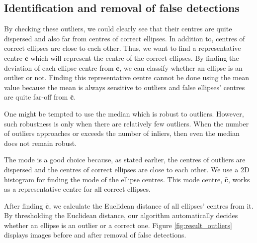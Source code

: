 \documentclass[preprint]{iucr}              %
\begin{document}
\subsection{Identification and removal of false detections}
By checking these outliers, we could clearly see that their centres are quite dispersed and also far from centres of correct ellipses. In addition to, centres of correct ellipses are close to each other. Thus, we want to find a representative centre $\mathbf{\bar{c}}$ which will represent the centre of the correct ellipses. By finding the deviation of each ellipse centre from $\mathbf{\bar{c}}$, we can classify whether an ellipse is an outlier or not. Finding this representative centre cannot be done using the mean value because the mean is always sensitive to outliers and false ellipses' centres are quite far-off from $\mathbf{\bar{c}}$. 

One might be tempted to use the median which is robust to outliers. However, such robustness is only when there are relatively few outliers. When the number of outliers approaches or exceeds the number of inliers, then even the median does not remain robust.

The mode is a good choice because, as stated earlier, the centres of outliers are dispersed and the centres of correct ellipses are close to each other. We use a 2D histogram for finding the mode of the ellipse centres. This mode centre, $\mathbf{\bar{c}}$, works as a representative centre for all correct ellipses. 

After finding $\mathbf{\bar{c}}$, we calculate the Euclidean distance of all ellipses' centres from it. By thresholding the Euclidean distance, our algorithm automatically decides whether an ellipse is an outlier or a correct one. Figure \ref{fig:result_outliers} displays images before and after removal of false detections.
\end{document}
